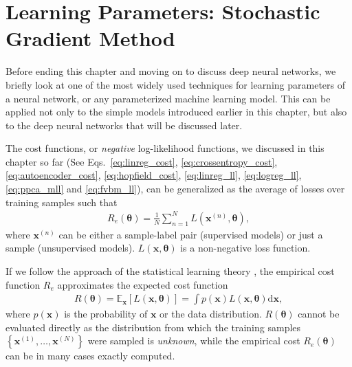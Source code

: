 \documentclass[dissertation,nocontribution]{aaltoseries}
\newcommand{\vect}[1]{\mathbf{#1}}
\newcommand{\vects}[1]{\boldsymbol{#1}}
\newcommand{\vx}[0]{\vect{x}}
\newcommand{\TT}[0]{{\vects{\theta}}}
\newcommand{\E}[0]{\mathbb{E}}
\newcommand{\dd}[1]{\text{d}{#1}}
\begin{document}


\section{Learning Parameters: Stochastic Gradient Method}
\label{sec:stochastic_grad}

Before ending this chapter and moving on to discuss deep
neural networks, we briefly look at one of the most widely
used techniques for learning parameters of a neural network,
or any parameterized machine learning model.  This can be
applied not only to the simple models introduced
earlier in this chapter, but also to the deep neural networks
that will be discussed later.

The cost functions, or \textit{negative} log-likelihood
functions, we discussed in this chapter so far (See
Eqs.~\eqref{eq:linreg_cost}, \eqref{eq:crossentropy_cost},
\eqref{eq:autoencoder_cost}, \eqref{eq:hopfield_cost},
\eqref{eq:linreg_ll}, \eqref{eq:logreg_ll},
\eqref{eq:ppca_mll} and \eqref{eq:fvbm_ll}), can be
generalized as the average of losses over training samples such
that
\begin{align}
    \label{eq:slt_emp_cost}
    R_e(\TT) = \frac{1}{N} \sum_{n=1}^N L(\vx^{(n)}, \TT),
\end{align}
where $\vx^{(n)}$ can be either a sample-label pair
(supervised models) or just a sample (unsupervised models).
$L(\vx, \TT)$ is a non-negative loss function.

If we follow the approach of the statistical learning theory
\citep[see, e.g.][]{Vapnik1995}, the empirical cost function
$R_e$ approximates the expected cost function 
\begin{align}
    \label{eq:slt_exp_cost}
    R(\TT) = \E_{\vx} \left[ L(\vx, \TT) \right] = \int
    p(\vx) L(\vx, \TT) \dd{\vx},
\end{align}
where $p(\vx)$ is the probability of $\vx$ or the data
distribution. %
$R(\TT)$ cannot be evaluated directly
as the distribution from which the training samples $\left\{
\vx^{(1)}, \dots, \vx^{(N)} \right\}$ were sampled is
\textit{unknown}, while the empirical cost $R_e(\TT)$
can be in many cases exactly computed.
\end{document}
